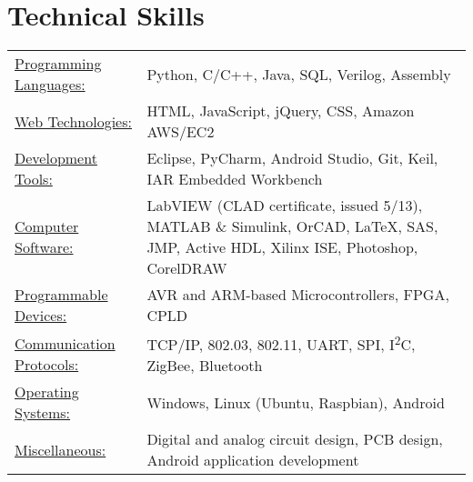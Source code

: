 \documentclass[10pt]{article}
\newlength{\WidthSkills}
\newlength{\WidthSkills}
\begin{document}
\section{Technical Skills}

\begin{flushleft}

\begin{tabular}{l p{\WidthSkills}}
    \underline{Programming Languages:} & Python, C/C++, Java, SQL, Verilog, Assembly \\
    \underline{Web Technologies:} & HTML, JavaScript, jQuery, CSS, Amazon AWS/EC2 \\
    \underline{Development Tools:} & Eclipse, PyCharm, Android Studio, Git, Keil, IAR Embedded Workbench \\
    \underline{Computer Software:} & LabVIEW (CLAD certificate, issued 5/13), MATLAB \& Simulink, OrCAD, \LaTeX, SAS, JMP, Active HDL, Xilinx ISE, Photoshop, CorelDRAW \\
    \underline{Programmable Devices:} & AVR and ARM-based Microcontrollers, FPGA, CPLD \\
    \underline{Communication Protocols:} & TCP/IP, 802.03, 802.11, UART, SPI, I\textsuperscript{2}C, ZigBee, Bluetooth \\
    \underline{Operating Systems:} & Windows, Linux (Ubuntu, Raspbian), Android \\
    \underline{Miscellaneous:} & Digital and analog circuit design, PCB design, Android application development
\end{tabular}

\end{flushleft}
\end{document}
